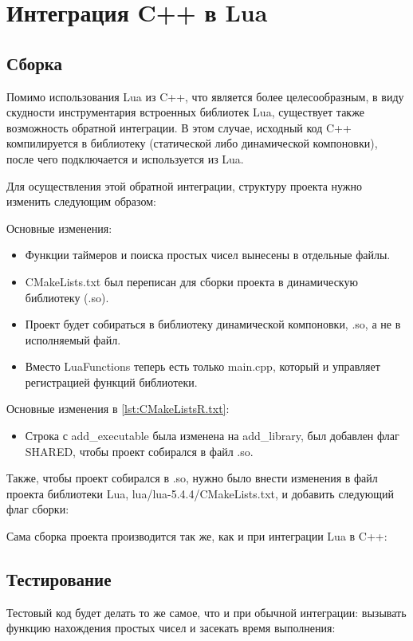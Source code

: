 \section{Интеграция C++ в Lua}

\subsection{Сборка}
Помимо использования Lua из C++, что является более целесообразным, в виду скудности инструментария встроенных библиотек Lua, существует также возможность обратной интеграции. В этом случае, исходный код C++ компилируется в библиотеку (статической либо динамической компоновки), после чего подключается и используется из Lua.

Для осуществления этой обратной интеграции, структуру проекта нужно изменить следующим образом:

Основные изменения:
\begin{itemize}
	\item Функции таймеров и поиска простых чисел вынесены в отдельные файлы.
	\item CMakeLists.txt был переписан для сборки проекта в динамическую библиотеку (.so).
	\item Проект будет собираться в библиотеку динамической компоновки, .so, а не в исполняемый файл.
	\item Вместо LuaFunctions теперь есть только main.cpp, который и управляет регистрацией функций библиотеки.
\end{itemize}

Основные изменения в \autoref{lst:CMakeListsR.txt}:
\begin{itemize}
	\item Строка с add\_executable была изменена на add\_library, был добавлен флаг SHARED, чтобы проект собирался в файл .so.
\end{itemize}

Также, чтобы проект собирался в .so, нужно было внести изменения в файл проекта библиотеки Lua, lua/lua-5.4.4/CMakeLists.txt, и добавить следующий флаг сборки:

Сама сборка проекта производится так же, как и при интеграции Lua в C++:
\clearpage

\subsection{Тестирование}
Тестовый код будет делать то же самое, что и при обычной интеграции: вызывать функцию нахождения простых чисел и засекать время выполнения:

